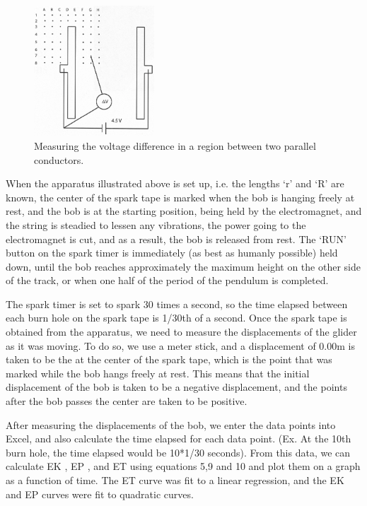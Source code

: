 \documentclass[letterpaper]{article}
\begin{document}
\begin{figure}[h!]
  \centering
  \includegraphics[width=0.4\textwidth]{fig3.jpg}
  \caption{Measuring the voltage difference in a region between two parallel conductors. \cite{labmanual}}
\end{figure}
When the apparatus illustrated above is set up, i.e. the lengths ‘r’ and ‘R’ are known, the center of the spark tape is marked when the bob is hanging freely at rest, and the bob is at the starting position, being held by the electromagnet, and the string is steadied to lessen any vibrations, the power going to the electromagnet is cut, and as a result, the bob is released from rest. The ‘RUN’ button on the spark timer is immediately (as best as humanly possible) held down, until the bob reaches approximately the maximum height on the other side of the track, or when one half of the period of the pendulum is completed.

The spark timer is set to spark 30 times a second, so the time elapsed between each burn hole on the spark tape is 1/30th of a second. Once the spark tape is obtained from the apparatus, we need to measure the displacements of the glider as it was moving. To do so, we use a meter stick, and a displacement of 0.00m is taken to be the at the center of the spark tape, which is the point that was marked while the bob hangs freely at rest. This means that the initial displacement of the bob is taken to be a negative displacement, and the points after the bob passes the center are taken to be positive.

After measuring the displacements of the bob, we enter the data points into Excel, and also calculate the time elapsed for each data point. (Ex. At the 10th burn hole, the time elapsed would be 10*1/30 seconds). From this data, we can calculate EK , EP , and ET  using equations  5,9 and 10 and plot them on a graph as a function of time. The ET curve was fit to a linear regression, and the EK and EP curves were fit to quadratic curves.
\end{document}
